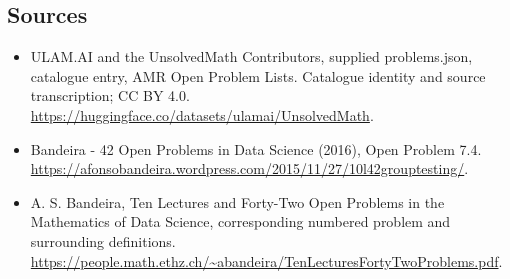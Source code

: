 \documentclass[11pt,a4paper]{article}
\begin{document}
\subsection{Sources}
\begin{itemize}
\item[S1] ULAM.AI and the UnsolvedMath Contributors, supplied problems.json, catalogue entry, AMR Open Problem Lists. Catalogue identity and source transcription; CC BY 4.0.
\url{https://huggingface.co/datasets/ulamai/UnsolvedMath}.
\item[S2] Bandeira - 42 Open Problems in Data Science (2016), Open Problem 7.4. 
\url{https://afonsobandeira.wordpress.com/2015/11/27/10l42grouptesting/}.
\item[S3] A. S. Bandeira, Ten Lectures and Forty-Two Open Problems in the Mathematics of Data Science, corresponding numbered problem and surrounding definitions.
\url{https://people.math.ethz.ch/~abandeira/TenLecturesFortyTwoProblems.pdf}.
\end{itemize}
\end{document}
